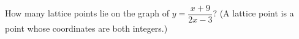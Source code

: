 How many lattice points lie on the graph of $y=\dfrac{x+9}{2x-3}$? (A lattice point is a point whose coordinates are both integers.)
